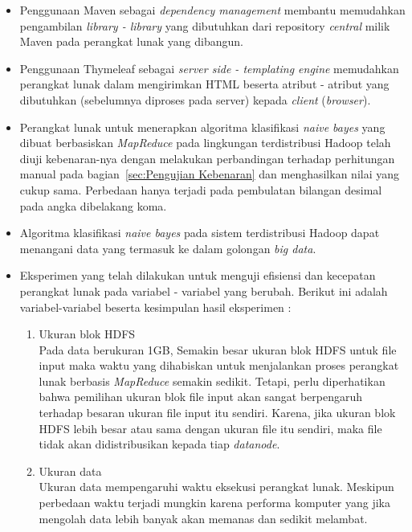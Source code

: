 \begin{itemize}
	\item Penggunaan Maven sebagai \textit{dependency management} membantu memudahkan pengambilan \textit{library - library} yang dibutuhkan dari repository \textit{central} milik Maven pada perangkat lunak yang dibangun.
	
	\item Penggunaan Thymeleaf sebagai \textit{server side - templating engine} memudahkan perangkat lunak dalam mengirimkan HTML beserta atribut - atribut yang dibutuhkan (sebelumnya diproses pada server) kepada \textit{client} (\textit{browser}).
	
	\item Perangkat lunak untuk menerapkan algoritma klasifikasi \textit{naive bayes} yang dibuat berbasiskan \textit{MapReduce} pada lingkungan terdistribusi Hadoop telah diuji kebenaran-nya dengan melakukan perbandingan terhadap perhitungan manual pada bagian~\ref{sec:Pengujian Kebenaran} dan menghasilkan nilai yang cukup sama. Perbedaan hanya terjadi pada pembulatan bilangan desimal pada angka dibelakang koma.
	\item Algoritma klasifikasi \textit{naive bayes} pada sistem terdistribusi Hadoop dapat menangani data yang termasuk ke dalam golongan \textit{big data}.
	\item Eksperimen yang telah dilakukan untuk menguji efisiensi dan kecepatan perangkat lunak pada variabel - variabel yang berubah. Berikut ini adalah variabel-variabel beserta kesimpulan hasil eksperimen :
	\begin{enumerate}[label=(\alph*)]
		\item Ukuran blok HDFS\\
		Pada data berukuran 1GB, Semakin besar ukuran blok HDFS untuk file input maka waktu yang dihabiskan untuk menjalankan proses perangkat lunak berbasis \textit{MapReduce} semakin sedikit. Tetapi, perlu diperhatikan bahwa pemilihan ukuran blok file input akan sangat berpengaruh terhadap besaran ukuran file input itu sendiri. Karena, jika ukuran blok HDFS lebih besar atau sama dengan ukuran file itu sendiri, maka file tidak akan didistribusikan kepada tiap \textit{datanode}.
		
		\item Ukuran data\\
		Ukuran data mempengaruhi waktu eksekusi perangkat lunak. Meskipun perbedaan waktu terjadi mungkin karena performa komputer yang jika mengolah data lebih banyak akan memanas dan sedikit melambat.
		

\end{enumerate}
\end{itemize}
